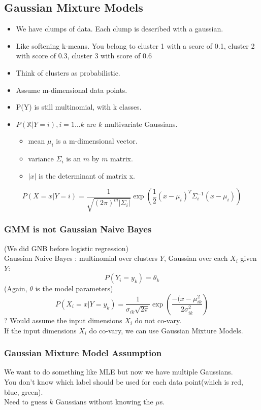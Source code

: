 \subsection{Gaussian Mixture Models}
\begin{itemize}
	\item We have clumps of data. Each clump is described with a gaussian.  %
	\item Like softening k-means.  You belong to cluster 1 with a score of 0.1, cluster 2 with score of 0.3, cluster 3 with score of 0.6
	\item Think of clusters as probabilistic. 
	\item Assume m-dimensional data points.
	\item P(Y) is still multinomial, with k classes.
	\item $P(\mathbb{X} | Y=i), i=1 \dots k$ are $k$ multivariate Gaussians.
		\begin{itemize}
			\item mean $\mu_i$ is a m-dimensional vector.
			\item variance $\Sigma_i$ is an $m$ by $m$ matrix.
			\item $|x|$ is the determinant of matrix x. 
		\end{itemize}
\end{itemize}

$$ P(X=x | Y=i) = \frac{1}{\sqrt{(2 \pi)^m | \Sigma_i |}} \exp \left(  \frac{1}{2}(x - \mu_i)^T \Sigma_i^{-1} (x- \mu_i) \right) $$

\subsubsection{GMM is not Gaussian Naive Bayes}
(We did GNB before logistic regression) \hfill \\
Gaussian Naive Bayes : multinomial over clusters $Y$, Gaussian over each $X_i$ given $Y$:
$$ P(Y_i = y_k) = \theta_k $$
(Again, $\theta$ is the model parameters)
$$ P(X_i = x | Y = y_k) = \frac{1}{\sigma_{ik} \sqrt{2 \pi}} \exp \left(  \frac{-(x - \mu_{ik}^2}{2 \sigma_{ik}^2} \right) $$
? Would assume the input dimensions $X_i$ do not co-vary. \hfill \\

If the input dimensions $X_i$ do co-vary, we can use Gaussian Mixture Models. 

\subsubsection{Gaussian Mixture Model Assumption}
We want to do something like MLE but now we have multiple Gaussians. \hfill \\
You don't know which label should be used for each data point(which is red, blue, green). \hfill \\
Need to guess $k$ Gaussians without knowing the $\mu$s.  \hfill \\

